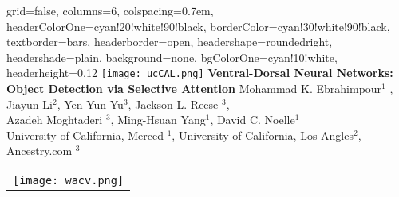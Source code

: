 \documentclass[landscape,paperwidth=46.8in,paperheight=33.1in,fontscale=0.292]{baposter}
\begin{document}
\begin{poster}{
 grid=false,
 columns=6,
 colspacing=0.7em,
 headerColorOne=cyan!20!white!90!black,
 borderColor=cyan!30!white!90!black,
 textborder=bars,
 headerborder=open,
 headershape=roundedright,
 headershade=plain,
 background=none,
 bgColorOne=cyan!10!white,
 headerheight=0.12\textheight}
 {
      \texttt{[image: ucCAL.png]}
      \makebox[0.01\textwidth]{} 
      \makebox[0.04\textwidth]{} 
 }
 {\sc\huge\bf Ventral-Dorsal Neural Networks: Object Detection via Selective Attention}
 {\vspace{0.0em} Mohammad K. Ebrahimpour$^1$ , Jiayun Li$^2$, Yen-Yun Yu$^3$, Jackson L. Reese $^3$, \\ Azadeh Moghtaderi $^3$, Ming-Hsuan Yang$^1$, David C. Noelle$^1$  \\[0.2em]
 {University of California, Merced $^1$, University of California, Los Angles$^2$, Ancestry.com $^3$\\[0.2em] }}
 {
    \begin{tabular}{r}
        \texttt{[image: wacv.png]}
    \end{tabular}
 }


\end{poster}
\end{document}
